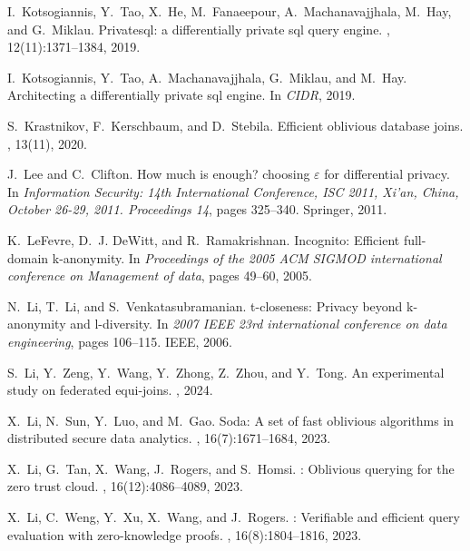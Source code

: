 \documentclass[11pt]{article}
\begin{document}
\begin{thebibliography}{140}
\begin{small}
I.~Kotsogiannis, Y.~Tao, X.~He, M.~Fanaeepour, A.~Machanavajjhala, M.~Hay, and
  G.~Miklau.
\newblock Privatesql: a differentially private sql query engine.
, 12(11):1371--1384, 2019.

I.~Kotsogiannis, Y.~Tao, A.~Machanavajjhala, G.~Miklau, and M.~Hay.
\newblock Architecting a differentially private sql engine.
\newblock In {\em CIDR}, 2019.

S.~Krastnikov, F.~Kerschbaum, and D.~Stebila.
\newblock Efficient oblivious database joins.
, 13(11), 2020.

J.~Lee and C.~Clifton.
\newblock How much is enough? choosing $\varepsilon$ for differential privacy.
\newblock In {\em Information Security: 14th International Conference, ISC
  2011, Xi’an, China, October 26-29, 2011. Proceedings 14}, pages 325--340.
  Springer, 2011.

K.~LeFevre, D.~J. DeWitt, and R.~Ramakrishnan.
\newblock Incognito: Efficient full-domain k-anonymity.
\newblock In {\em Proceedings of the 2005 ACM SIGMOD international conference
  on Management of data}, pages 49--60, 2005.

N.~Li, T.~Li, and S.~Venkatasubramanian.
\newblock t-closeness: Privacy beyond k-anonymity and l-diversity.
\newblock In {\em 2007 IEEE 23rd international conference on data engineering},
  pages 106--115. IEEE, 2006.

S.~Li, Y.~Zeng, Y.~Wang, Y.~Zhong, Z.~Zhou, and Y.~Tong.
\newblock An experimental study on federated equi-joins.
, 2024.

X.~Li, N.~Sun, Y.~Luo, and M.~Gao.
\newblock Soda: A set of fast oblivious algorithms in distributed secure data
  analytics.
, 16(7):1671--1684, 2023.

X.~Li, G.~Tan, X.~Wang, J.~Rogers, and S.~Homsi.
: Oblivious querying for the zero trust cloud.
, 16(12):4086--4089, 2023.

X.~Li, C.~Weng, Y.~Xu, X.~Wang, and J.~Rogers.
: Verifiable and efficient query evaluation with
  zero-knowledge proofs.
, 16(8):1804--1816, 2023.


\end{small}
\end{thebibliography}
\end{document}

